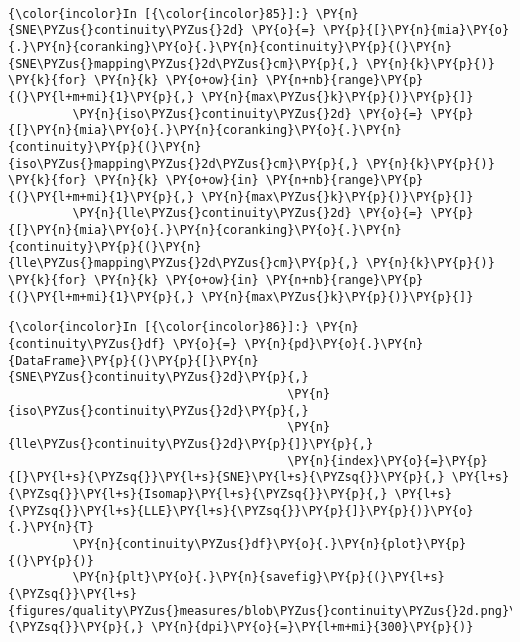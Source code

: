     \begin{center}
    \end{center}
    { \hspace*{\fill} \\}

    \begin{Verbatim}[commandchars=\\\{\}]
{\color{incolor}In [{\color{incolor}85}]:} \PY{n}{SNE\PYZus{}continuity\PYZus{}2d} \PY{o}{=} \PY{p}{[}\PY{n}{mia}\PY{o}{.}\PY{n}{coranking}\PY{o}{.}\PY{n}{continuity}\PY{p}{(}\PY{n}{SNE\PYZus{}mapping\PYZus{}2d\PYZus{}cm}\PY{p}{,} \PY{n}{k}\PY{p}{)} \PY{k}{for} \PY{n}{k} \PY{o+ow}{in} \PY{n+nb}{range}\PY{p}{(}\PY{l+m+mi}{1}\PY{p}{,} \PY{n}{max\PYZus{}k}\PY{p}{)}\PY{p}{]}
         \PY{n}{iso\PYZus{}continuity\PYZus{}2d} \PY{o}{=} \PY{p}{[}\PY{n}{mia}\PY{o}{.}\PY{n}{coranking}\PY{o}{.}\PY{n}{continuity}\PY{p}{(}\PY{n}{iso\PYZus{}mapping\PYZus{}2d\PYZus{}cm}\PY{p}{,} \PY{n}{k}\PY{p}{)} \PY{k}{for} \PY{n}{k} \PY{o+ow}{in} \PY{n+nb}{range}\PY{p}{(}\PY{l+m+mi}{1}\PY{p}{,} \PY{n}{max\PYZus{}k}\PY{p}{)}\PY{p}{]}
         \PY{n}{lle\PYZus{}continuity\PYZus{}2d} \PY{o}{=} \PY{p}{[}\PY{n}{mia}\PY{o}{.}\PY{n}{coranking}\PY{o}{.}\PY{n}{continuity}\PY{p}{(}\PY{n}{lle\PYZus{}mapping\PYZus{}2d\PYZus{}cm}\PY{p}{,} \PY{n}{k}\PY{p}{)} \PY{k}{for} \PY{n}{k} \PY{o+ow}{in} \PY{n+nb}{range}\PY{p}{(}\PY{l+m+mi}{1}\PY{p}{,} \PY{n}{max\PYZus{}k}\PY{p}{)}\PY{p}{]}
\end{Verbatim}

    \begin{Verbatim}[commandchars=\\\{\}]
{\color{incolor}In [{\color{incolor}86}]:} \PY{n}{continuity\PYZus{}df} \PY{o}{=} \PY{n}{pd}\PY{o}{.}\PY{n}{DataFrame}\PY{p}{(}\PY{p}{[}\PY{n}{SNE\PYZus{}continuity\PYZus{}2d}\PY{p}{,}
                                       \PY{n}{iso\PYZus{}continuity\PYZus{}2d}\PY{p}{,}
                                       \PY{n}{lle\PYZus{}continuity\PYZus{}2d}\PY{p}{]}\PY{p}{,}
                                       \PY{n}{index}\PY{o}{=}\PY{p}{[}\PY{l+s}{\PYZsq{}}\PY{l+s}{SNE}\PY{l+s}{\PYZsq{}}\PY{p}{,} \PY{l+s}{\PYZsq{}}\PY{l+s}{Isomap}\PY{l+s}{\PYZsq{}}\PY{p}{,} \PY{l+s}{\PYZsq{}}\PY{l+s}{LLE}\PY{l+s}{\PYZsq{}}\PY{p}{]}\PY{p}{)}\PY{o}{.}\PY{n}{T}
         \PY{n}{continuity\PYZus{}df}\PY{o}{.}\PY{n}{plot}\PY{p}{(}\PY{p}{)}
         \PY{n}{plt}\PY{o}{.}\PY{n}{savefig}\PY{p}{(}\PY{l+s}{\PYZsq{}}\PY{l+s}{figures/quality\PYZus{}measures/blob\PYZus{}continuity\PYZus{}2d.png}\PY{l+s}{\PYZsq{}}\PY{p}{,} \PY{n}{dpi}\PY{o}{=}\PY{l+m+mi}{300}\PY{p}{)}
\end{Verbatim}

